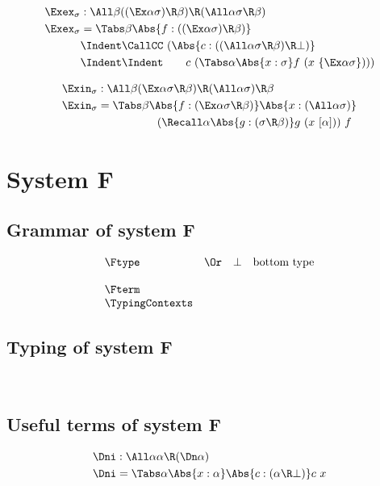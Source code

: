 \documentclass{amsart}
\begin{document}
\begin{align*}
\Exex_\sigma & : \All\beta
  ((\Ex\alpha \sigma) \R \beta) \R
  (\All\alpha \sigma \R \beta)
  \\
\Exex_\sigma & = \Tabs\beta
  \Abs{f:((\Ex\alpha\sigma) \R \beta)}
  \\ &\Indent
  \CallCC~(\Abs{c : ((\All\alpha \sigma \R \beta) \R \bot)}
  \\ &\Indent\Indent\hspace{2em}
  c~(\Tabs\alpha \Abs{x : \sigma}
  f~(x~\{\Ex\alpha \sigma\})))
\end{align*}

\begin{align*}
\Exin_\sigma & : \All\beta
  (\Ex\alpha \sigma \R \beta) \R
  (\All\alpha\sigma) \R \beta
  \\
\Exin_\sigma & = \Tabs\beta
  \Abs{f : (\Ex\alpha \sigma \R \beta)}
  \Abs{x : (\All\alpha \sigma)}
  \\ &\hspace{5.3em}
  (\Recall\alpha
  \Abs{g : (\sigma \R \beta)}
  g~(x~[\alpha]))~f
\end{align*}

\section{System F}

\subsection{Grammar of system F}

\[
\begin{array}{lclr}
\Ftype
&\Or& \bot & \mbox{bottom type} \\
\\
\Fterm
\\
\TypingContexts
\end{array}
\]

\subsection{Typing of system F}
~

\FRules

\subsection{Useful terms of system F}
\label{sec:f-terms}

\begin{align*}
\Dni & : \All\alpha \alpha \R (\Dn\alpha) \\
\Dni & = \Tabs\alpha \Abs{x:\alpha}
           \Abs{c : (\alpha \R \bot)} c~x
\end{align*}
\end{document}
